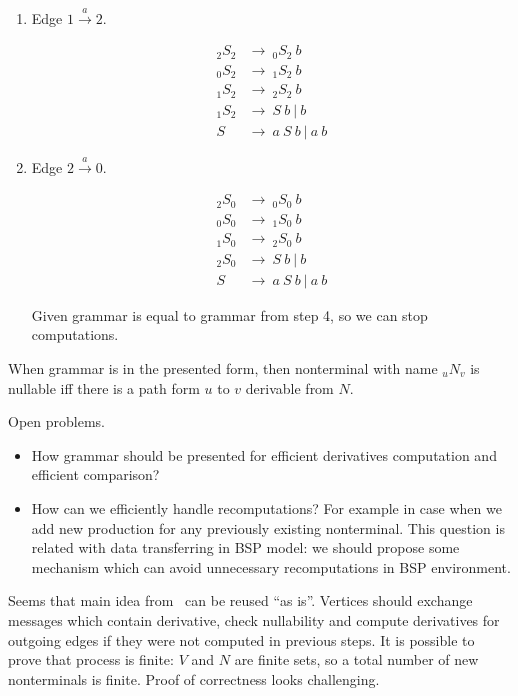\documentclass[12pt]{article}  %
\theoremstyle{definition}
\theoremstyle{remark}
\begin{document}
\begin{enumerate}
\item Edge $1 \xrightarrow{a} 2$.

\begin{align*}
_{2}S_2 & \rightarrow \ _{0}S_2 \ b  
\\
_{0}S_2 & \rightarrow \ _{1}S_2 \ b  
\\
_{1}S_2 & \rightarrow \ _{2}S_2 \ b  
\\
_{1}S_2 & \rightarrow \ S \ b \ | \ b 
\\
S & \rightarrow \ a \ S \ b \ | \ a \ b 
\end{align*}


\item Edge $2 \xrightarrow{a} 0$.

\begin{align*}
_{2}S_0 & \rightarrow \ _{0}S_0 \ b  
\\
_{0}S_0 & \rightarrow \ _{1}S_0 \ b  
\\
_{1}S_0 & \rightarrow \ _{2}S_0 \ b  
\\
_{2}S_0 & \rightarrow \ S \ b \ | \ b 
\\
S & \rightarrow \ a \ S \ b \ | \ a \ b 
\end{align*}


Given grammar is equal to grammar from step 4, so we can stop computations.


\end{enumerate}


When grammar is in the presented form, then nonterminal with name $_{u}N_{v}$ is nullable iff there is a path form $u$ to $v$ derivable from $N$.

Open problems.
\begin{itemize}
\item How grammar should be presented for efficient derivatives computation and efficient comparison?
\item How can we efficiently handle recomputations?
For example in case when we add new production for any previously existing nonterminal.
This question is related with data transferring in BSP model: we should propose some mechanism which can avoid unnecessary recomputations in BSP environment.
\end{itemize}


Seems that main idea from~\cite{DerForReg} can be reused ``as is''.
Vertices should exchange messages which contain derivative, check nullability and compute derivatives for outgoing edges if they were not computed in previous steps.
It is possible to prove that process is finite: $V$ and $N$ are finite sets, so a total number of new nonterminals is finite.
Proof of correctness looks challenging.
\end{document}
